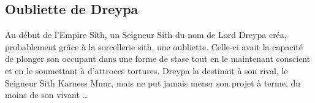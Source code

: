 \begin{figure}[!h]
\end{figure}

\twocolumn

\subsection{Oubliette de Dreypa}\label{sec:oubliette-de-dreypa}
Au début de l'Empire Sith, un Seigneur Sith du nom de Lord Dreypa créa, probablement grâce à la sorcellerie sith, une oubliette. Celle-ci avait la capacité de plonger son occupant dans une forme de stase tout en le maintenant conscient et en le soumettant à d’attroces tortures. Dreypa la destinait à son rival, le Seigneur Sith Karness Muur, mais ne put jamais mener son projet à terme, du moins de son vivant \ldots

